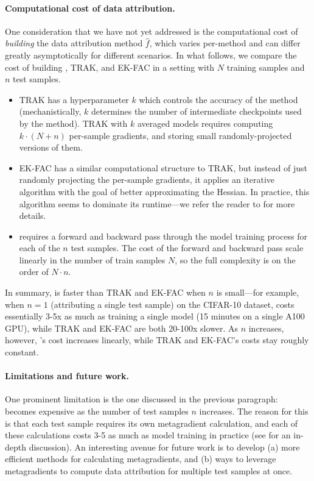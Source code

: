 \paragraph{Computational cost of data attribution.}
One consideration that we have not yet addressed is the computational cost
of {\em building} the data attribution method $\hat{f}$, which varies
per-method and can differ greatly asymptotically for different scenarios.
In what follows, we compare the cost of building \method{},
TRAK, and EK-FAC in a setting with $N$ training samples and $n$ test samples.
\begin{itemize}
  \item TRAK \citep{park2023trak} has a hyperparameter $k$ which 
  controls the accuracy of the method (mechanistically, $k$ 
  determines the number of intermediate checkpoints used by the method).
  TRAK with $k$ averaged models requires computing
  $k \cdot (N + n)$ per-sample gradients, and storing small 
  randomly-projected versions of them. 
  \item EK-FAC has a similar computational structure to TRAK, but 
  instead of just randomly projecting the per-sample gradients, 
  it applies an iterative algorithm with the goal of better 
  approximating the Hessian. 
  In practice, this algorithm seems to dominate 
  its runtime---we refer the reader to \citep{george2018fast} for more details.
  \item \method{} requires a forward and backward pass through the model
    training process for each of the $n$ test samples. The cost 
    of the forward and backward pass scale linearly 
    in the number of train samples $N$, 
    so the full complexity is on the order of $N\cdot n$.
\end{itemize}
In summary, \method{} is faster than TRAK and EK-FAC when $n$ is
small---for example, when $n = 1$ (attributing a single test sample)
on the CIFAR-10 dataset, 
\method{} costs essentially 3-5x as much as training a single model
(15 minutes on a single A100 GPU),
while TRAK and EK-FAC are both 20-100x slower.
As $n$ increases, however, \method{}'s cost increases linearly,
while TRAK and EK-FAC's costs stay roughly constant.




\paragraph{Limitations and future work.}
One prominent limitation is the one discussed in the previous paragraph: 
\method{} becomes expensive as the number of test samples $n$ increases.
The reason for this is that each test sample requires its 
own metagradient calculation, and each of these calculations 
costs 3-5\texttimes{} as much as model training in practice
(see \citet{engstrom2025optimizing} for an in-depth discussion).
An interesting avenue for future work is to develop (a) more efficient 
methods for calculating metagradients, and (b) ways to leverage metagradients to
compute data attribution for multiple test samples at once.

